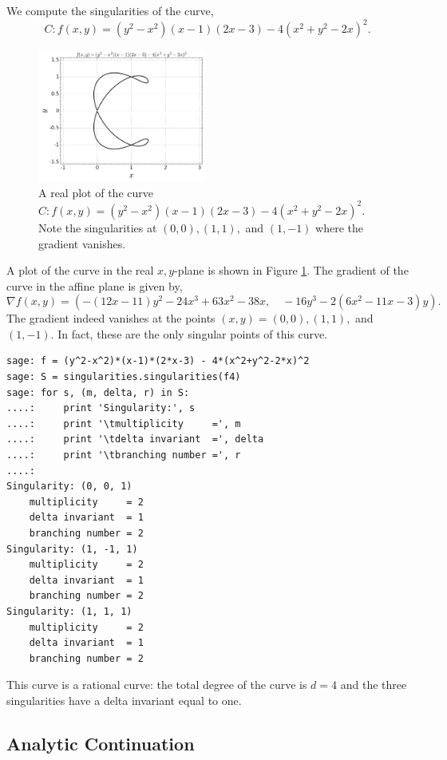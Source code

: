 \begin{example}
We compute the singularities of the curve,
\[
  C : f(x,y) = (y^2-x^2)(x-1)(2x-3) - 4(x^2+y^2-2x)^2.
\]
\begin{figure}
  \centering
  \includegraphics[width=0.49\textwidth]{images/f-singularities-example.png}
  \caption{A real plot of the curve $C: f(x,y) = (y^2-x^2)(x-1)(2x-3) -
    4(x^2+y^2-2x)^2$. Note the singularities at $(0,0), (1,1),$ and $(1,-1)$
    where the gradient vanishes.}
  \label{fig:f-singularities-example}
\end{figure}
A plot of the curve in the real $x,y$-plane is shown in Figure
\ref{fig:f-singularities-example}. The gradient of the curve in the affine plane
is given by,
\[
  \nabla f(x,y) = \left(
    -(12x-11)y^2 -24x^3 + 63x^2 - 38x, \quad
    -16y^3 - 2(6x^2 - 11x - 3)y
  \right).
\]
The gradient indeed vanishes at the points $(x,y) = (0,0), (1,1),$ and $(1,-1)$.
In fact, these are the only singular points of this curve.
\begin{lstlisting}
sage: f = (y^2-x^2)*(x-1)*(2*x-3) - 4*(x^2+y^2-2*x)^2
sage: S = singularities.singularities(f4)
sage: for s, (m, delta, r) in S:
....:     print 'Singularity:', s
....:     print '\tmultiplicity     =', m
....:     print '\tdelta invariant  =', delta
....:     print '\tbranching number =', r
....:
Singularity: (0, 0, 1)
	multiplicity     = 2
	delta invariant  = 1
	branching number = 2
Singularity: (1, -1, 1)
	multiplicity     = 2
	delta invariant  = 1
	branching number = 2
Singularity: (1, 1, 1)
	multiplicity     = 2
	delta invariant  = 1
	branching number = 2
\end{lstlisting}
This curve is a rational curve: the total degree of the curve is $d=4$ and the
three singularities have a delta invariant equal to one.
\end{example}


\subsection{Analytic Continuation}\label{subsec:background-analytic-continuation}


